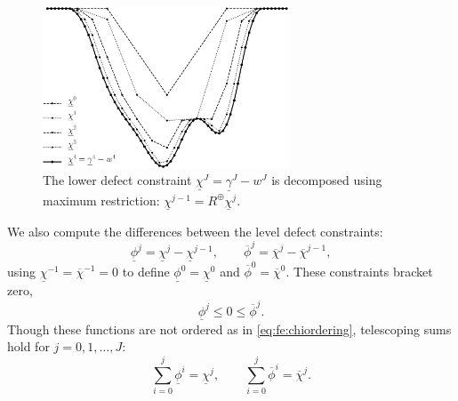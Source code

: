 \documentclass[letterpaper,final,12pt,reqno]{amsart}
\theoremstyle{cstyle}
\theoremstyle{cstyle*}
\theoremstyle{dstyle}
\numberwithin{equation}{section}
\numberwithin{figure}{section}
\numberwithin{table}{section}
\numberwithin{theorem}{section}
\newcommand{\maxR}{R^{\bm{\oplus}}}
\begin{document}
\begin{figure}
\includegraphics[width=0.65\textwidth]{fixfigs/chiphilevels.pdf}
\caption{The lower defect constraint $\underline{\chi}^J = \underline{\gamma}^J - w^J$ is decomposed using maximum restriction: $\underline{\chi}^{j-1} = \maxR \underline{\chi}^j$.}
\label{fig:chiphilevels}
\end{figure}

We also compute the differences between the level defect constraints:
\begin{equation}
\underline{\phi}^j = \underline{\chi}^j - \underline{\chi}^{j-1}, \qquad \overline{\phi}^j = \overline{\chi}^j - \overline{\chi}^{j-1},  \label{eq:fe:philevels}
\end{equation}
using $\underline{\chi}^{-1}=\overline{\chi}^{-1}=0$ to define $\underline{\phi}^0=\underline{\chi}^0$ and $\overline{\phi}^0=\overline{\chi}^0$.  These constraints bracket zero,
\begin{equation}
\underline{\phi}^j \le 0 \le \overline{\phi}^j.  \label{eq:fe:phibrackets}
\end{equation}
Though these functions are not ordered as in \eqref{eq:fe:chiordering}, telescoping sums hold for $j=0,1,\dots,J$:
\begin{equation}
\sum_{i=0}^j \underline{\phi}^i = \underline{\chi}^j, \qquad \sum_{i=0}^j \overline{\phi}^i = \overline{\chi}^j.  \label{eq:fe:telescoping}
\end{equation}
\end{document}
